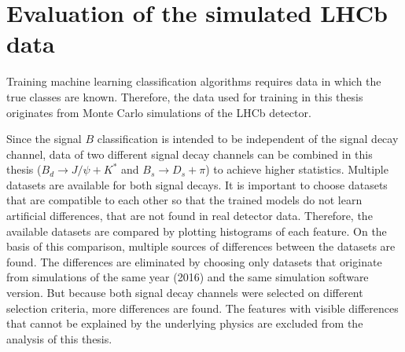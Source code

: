 \section{Evaluation of the simulated LHCb data}

Training machine learning classification algorithms requires data in which the true classes are known.
Therefore, the data used for training in this thesis originates from Monte Carlo simulations of the LHCb detector.

Since the signal $B$ classification is intended to be independent of the signal decay channel, data of two different signal decay channels can be combined in this thesis ($B_d \rightarrow J/\psi + K^*$ and $B_s \rightarrow D_s + \pi$) to achieve higher statistics.
Multiple datasets are available for both signal decays. 
It is important to choose datasets that are compatible to each other so that the trained models do not learn artificial differences, that are not found in real detector data.
Therefore, the available datasets are compared by plotting histograms of each feature.
On the basis of this comparison, multiple sources of differences between the datasets are found.
The differences are eliminated by choosing only datasets that originate from simulations of the same year (2016) and the same simulation software version.
But because both signal decay channels were selected on different selection criteria, more differences are found.
The features with visible differences that cannot be explained by the underlying physics are excluded from the analysis of this thesis.




